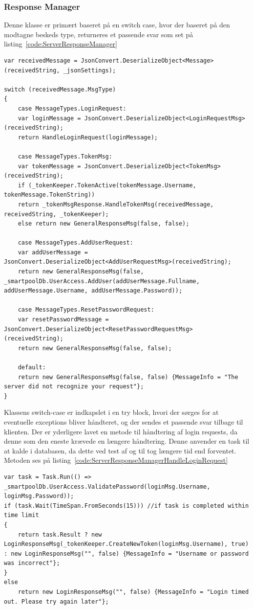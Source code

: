 \subsubsection{Response Manager}
Denne klasse er primært baseret på en switch case, hvor der baseret på den modtagne beskeds type, returneres et passende svar som set på listing~\ref{code:ServerResponseManager}
\begin{lstlisting}[caption=Server.ResponseManager,label=code:ServerResponseManager]
var receivedMessage = JsonConvert.DeserializeObject<Message>(receivedString, _jsonSettings);

switch (receivedMessage.MsgType)
{
	case MessageTypes.LoginRequest:
	var loginMessage = JsonConvert.DeserializeObject<LoginRequestMsg>(receivedString);
	return HandleLoginRequest(loginMessage);
	
	case MessageTypes.TokenMsg:
	var tokenMessage = JsonConvert.DeserializeObject<TokenMsg>(receivedString);
	if (_tokenKeeper.TokenActive(tokenMessage.Username, tokenMessage.TokenString))
	return _tokenMsgResponse.HandleTokenMsg(receivedMessage, receivedString, _tokenKeeper);
	else return new GeneralResponseMsg(false, false);
	
	case MessageTypes.AddUserRequest:
	var addUserMessage = JsonConvert.DeserializeObject<AddUserRequestMsg>(receivedString);
	return new GeneralResponseMsg(false, _smartpoolDb.UserAccess.AddUser(addUserMessage.Fullname, addUserMessage.Username, addUserMessage.Password));

	case MessageTypes.ResetPasswordRequest:
	var resetPasswordMessage = JsonConvert.DeserializeObject<ResetPasswordRequestMsg>(receivedString);
	return new GeneralResponseMsg(false, false);
	
	default:
	return new GeneralResponseMsg(false, false)	{MessageInfo = "The server did not recognize your request"};
}
\end{lstlisting}

Klassens switch-case er indkapslet i en try block, hvori der sørges for at eventuelle exceptions bliver håndteret, og der sendes et passende svar tilbage til klienten. Der er yderligere lavet en metode til håndtering af login requests, da denne som den eneste krævede en længere håndtering. Denne anvender en task til at kalde i databasen, da dette ved test af og til tog længere tid end forventet. Metoden ses på listing~\ref{code:ServerResponseManagerHandleLoginRequest}

\begin{lstlisting}[caption=Server.ResponseManager.HandleLoginRequest,label=code:ServerResponseManagerHandleLoginRequest]
var task = Task.Run(() => _smartpoolDb.UserAccess.ValidatePassword(loginMsg.Username, loginMsg.Password));
if (task.Wait(TimeSpan.FromSeconds(15))) //if task is completed within time limit
{
	return task.Result ? new LoginResponseMsg(_tokenKeeper.CreateNewToken(loginMsg.Username), true) : new LoginResponseMsg("", false) {MessageInfo = "Username or password was incorrect"};
}
else
	return new LoginResponseMsg("", false) {MessageInfo = "Login timed out. Please try again later"};
\end{lstlisting}

